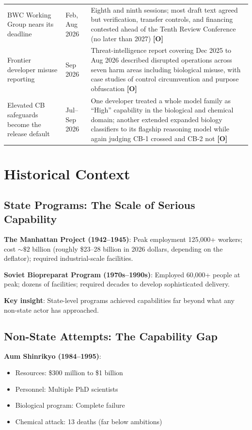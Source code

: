 \documentclass[11pt,letterpaper]{article}
\begin{document}
\begin{center}
\begin{longtable}{L{4cm}L{1.8cm}L{9.2cm}}
BWC Working Group nears its deadline & Feb, Aug 2026 & Eighth and ninth sessions; most draft text agreed but verification, transfer controls, and financing contested ahead of the Tenth Review Conference (no later than 2027) \textbf{[O]} \\
Frontier developer misuse reporting & Sep 2026 & Threat-intelligence report covering Dec 2025 to Aug 2026 described disrupted operations across seven harm areas including biological misuse, with case studies of control circumvention and purpose obfuscation \textbf{[O]} \\
Elevated CB safeguards become the release default & Jul--Sep 2026 & One developer treated a whole model family as ``High'' capability in the biological and chemical domain; another extended expanded biology classifiers to its flagship reasoning model while again judging CB-1 crossed and CB-2 not \textbf{[O]} \\
\bottomrule
\end{longtable}
\end{center}

\section{Historical Context}

\subsection{State Programs: The Scale of Serious Capability}

\textbf{The Manhattan Project (1942--1945)}: Peak employment 125,000+ workers; cost ${\sim}\$2$ billion (roughly \$23--28 billion in 2026 dollars, depending on the deflator); required industrial-scale facilities.

\textbf{Soviet Biopreparat Program (1970s--1990s)}: Employed 60,000+ people at peak; dozens of facilities; required decades to develop sophisticated delivery.

\textbf{Key insight}: State-level programs achieved capabilities far beyond what any non-state actor has approached.

\subsection{Non-State Attempts: The Capability Gap}

\textbf{Aum Shinrikyo (1984--1995)}:
\begin{itemize}[nosep]
  \item Resources: \$300 million to \$1 billion
  \item Personnel: Multiple PhD scientists
  \item Biological program: Complete failure
  \item Chemical attack: 13 deaths (far below ambitions)
\end{itemize}
\end{document}
